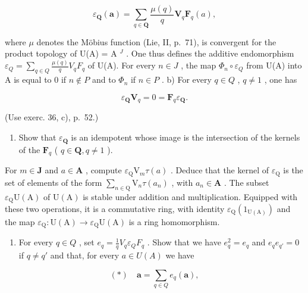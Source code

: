 \[
\varepsilon_ {\mathbf {Q}} (\boldsymbol {a}) = \sum_ {q \in \mathbf {Q}} \frac {\mu (q)}{q} \mathbf {V} _ {q} \mathbf {F} _ {q} (a),
\]

where \(\mu\) denotes the Möbius function (Lie, II, p.~71), is convergent for the product topology of U(A) = A \(^{J}\) . One thus defines the additive endomorphism \(\varepsilon_{Q} = \sum_{q \in Q} \frac{\mu(q)}{q} V_{q} F_{q}\) of U(A). For every \(n \in J\) , the map \(\Phi_{n} \circ \varepsilon_{Q}\) from U(A) into A is equal to 0 if \(n \notin P\) and to \(\Phi_{n}\) if \(n \in P\) . b) For every \(q \in Q\) , \(q \neq 1\) , one has

\[
\varepsilon_ {\mathbf {Q}} \mathbf {V} _ {q} = 0 = \mathbf {F} _ {q} \varepsilon_ {\mathbf {Q}}.
\]

(Use exerc. 36, c), p.~52.)

\begin{enumerate}
\def\labelenumi{\alph{enumi})}
\setcounter{enumi}{2}
\tightlist
\item
  Show that \(\varepsilon_{\mathbf{Q}}\) is an idempotent whose image is the intersection of the kernels of the \(\mathbf{F}_{q}\) ( \(q \in \mathbf{Q}, q \neq 1\) ).
\end{enumerate}

For \(m \in \mathbf{J}\) and \(a \in \mathbf{A}\) , compute \(\varepsilon_{\mathrm{Q}} \mathrm{V}_{m} \tau(a)\) . Deduce that the kernel of \(\varepsilon_{\mathrm{Q}}\) is the set of elements of the form \(\sum_{n \in \mathrm{Q}} \mathrm{V}_{n} \tau(a_{n})\) , with \(a_{n} \in \mathbf{A}\) . The subset \(\varepsilon_{\mathrm{Q}} \mathrm{U}(\mathrm{A})\) of \(\mathrm{U}(\mathrm{A})\) is stable under addition and multiplication. Equipped with these two operations, it is a commutative ring, with identity \(\varepsilon_{\mathrm{Q}}(1_{\mathrm{U}(\mathrm{A})})\) and the map \(\varepsilon_{\mathrm{Q}}: \mathrm{U}(\mathrm{A}) \to \varepsilon_{\mathrm{Q}} \mathrm{U}(\mathrm{A})\) is a ring homomorphism.

\begin{enumerate}
\def\labelenumi{\alph{enumi})}
\setcounter{enumi}{3}
\tightlist
\item
  For every \(q \in Q\) , set \(e_{q} = \frac{1}{q} V_{q} \varepsilon_{Q} F_{q}\) . Show that we have \(e_{q}^{2} = e_{q}\) and \(e_{q} e_{q'} = 0\) if \(q \neq q'\) and that, for every \(a \in U(A)\) we have
\end{enumerate}

\[
(*) \quad \boldsymbol {a} = \sum_ {q \in Q} e _ {q} (\boldsymbol {a}),
\]

